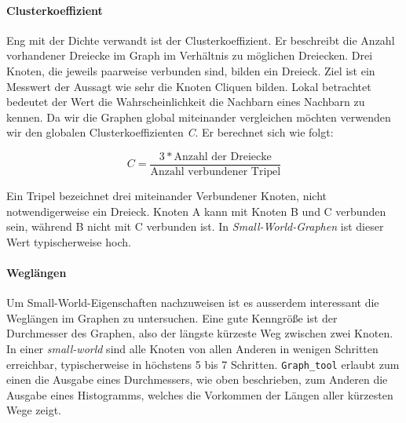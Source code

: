 \documentclass[12pt, a4paper]{article}
\begin{document}
\paragraph{Clusterkoeffizient}

Eng mit der Dichte verwandt ist der Clusterkoeffizient. Er beschreibt die
Anzahl vorhandener Dreiecke im Graph im Verhältnis zu möglichen Dreiecken. Drei
Knoten, die jeweils paarweise verbunden sind, bilden ein Dreieck. Ziel ist ein
Messwert der Aussagt wie sehr die Knoten Cliquen bilden. Lokal betrachtet
bedeutet der Wert die Wahrscheinlichkeit die Nachbarn eines Nachbarn zu kennen.
Da wir die Graphen global miteinander vergleichen möchten verwenden wir den
globalen Clusterkoeffizienten \emph{C}. Er berechnet sich wie folgt:

$$
    C = \frac{3*\text{Anzahl der Dreiecke}}{\text{Anzahl verbundener Tripel}}
$$

Ein Tripel bezeichnet drei miteinander Verbundener Knoten, nicht
notwendigerweise ein Dreieck. Knoten A kann mit Knoten B und C verbunden sein,
während B nicht mit C verbunden ist. In \emph{Small-World-Graphen} ist dieser
Wert typischerweise hoch. 




\paragraph{Wegl\"angen}
Um Small-World-Eigenschaften nachzuweisen ist es ausserdem interessant die
Weglängen im Graphen zu untersuchen. Eine gute Kenngröße ist der Durchmesser
des Graphen, also der längste kürzeste Weg zwischen zwei Knoten. In einer
\emph{small-world} sind alle Knoten von allen Anderen in wenigen Schritten
erreichbar, typischerweise in höchstens 5 bis 7 Schritten. \texttt{Graph\_tool}
erlaubt zum einen die Ausgabe eines Durchmessers, wie oben beschrieben, zum
Anderen die Ausgabe eines Histogramms, welches die Vorkommen der Längen aller
kürzesten Wege zeigt.
\end{document}
